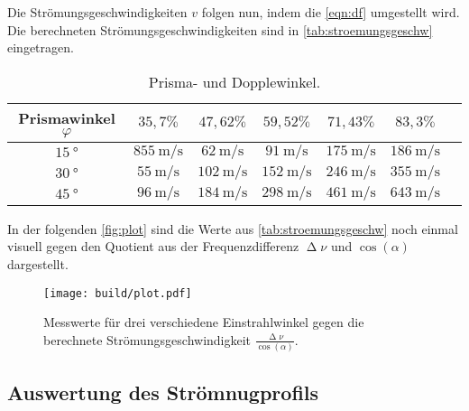 \noindent
Die Strömungsgeschwindigkeiten $v$ folgen nun, indem die \autoref{eqn:df} umgestellt wird. Die berechneten Strömungsgeschwindigkeiten sind in \autoref{tab:stroemungsgeschw} eingetragen.
\begin{table}[H]
  \centering
  \caption{Prisma- und Dopplewinkel.}
  \label{tab:stroemungsgeschw}
  \begin{tabular}{c c c c c c c}
    \toprule
    Prismawinkel $\varphi$ & $35,7 \%$ & $47,62 \%$ & $59,52 \%$ & $71,43 \%$ & $83,3 \%$\\
    \midrule
    $\SI{15}{\degree}$ & $\SI{855}{\meter\per\second}$ & $\SI{62}{\meter\per\second}$ & $\SI{91}{\meter\per\second}$ & $\SI{175}{\meter\per\second}$ & $\SI{186}{\meter\per\second}$ \\
    $\SI{30}{\degree}$ & $\SI{55}{\meter\per\second}$ & $\SI{102}{\meter\per\second}$ & $\SI{152}{\meter\per\second}$ & $\SI{246}{\meter\per\second}$ & $\SI{355}{\meter\per\second}$ \\
    $\SI{45}{\degree}$ & $\SI{96}{\meter\per\second}$ & $\SI{184}{\meter\per\second}$ & $\SI{298}{\meter\per\second}$ & $\SI{461}{\meter\per\second}$ & $\SI{643}{\meter\per\second}$ \\
    \bottomrule
  \end{tabular}
\end{table}

\noindent
In der folgenden \autoref{fig:plot} sind die Werte aus \autoref{tab:stroemungsgeschw} noch einmal visuell gegen den Quotient aus der Frequenzdifferenz $\upDelta \nu$ und $\cos(\alpha)$
dargestellt.
\begin{figure}[H]
  \centering
  \texttt{[image: build/plot.pdf]}
  \caption{Messwerte für drei verschiedene Einstrahlwinkel gegen die berechnete Strömungsgeschwindigkeit $\frac{\upDelta\nu}{\cos(\alpha)}$.}
  \label{fig:plot}
\end{figure}

\subsection{Auswertung des Strömnugprofils}
\label{subsec:StroemiProf}


